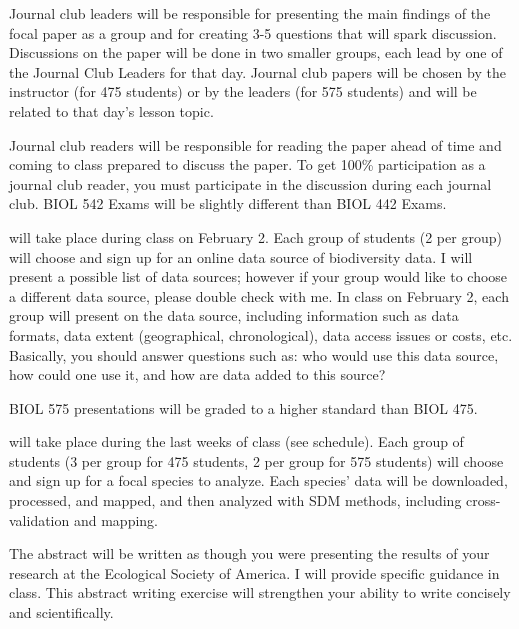 \documentclass{tufte-handout}
\begin{document}
\begin{fullwidth} 

Journal club leaders will be responsible for presenting the main findings of the focal paper as a group and for creating 3-5 questions that will spark discussion. Discussions on the paper will be done in two smaller groups, each lead by one of the Journal Club Leaders for that day. Journal club papers will be chosen by the instructor (for 475 students) or by the leaders (for 575 students) and will be related to that day's lesson topic. 


Journal club readers will be responsible for reading the paper ahead of time and coming to class prepared to discuss the paper. To get 100\% participation as a journal club reader, you must participate in the discussion during each journal club. BIOL 542 Exams will be slightly different than BIOL 442 Exams. 



 will take place during class on February 2. Each group of students (2 per group) will choose and sign up for an online data source of biodiversity data. I will present a possible list of data sources; however if your group would like to choose a different data source, please double check with me. In class on February 2, each group will present on the data source, including information such as data formats, data extent (geographical, chronological), data access issues or costs, etc. Basically, you should answer questions such as: who would use this data source, how could one use it, and how are data added to this source? 

BIOL 575 presentations will be graded to a higher standard than BIOL 475. 


 will take place during the last weeks of class (see schedule). Each group of students (3 per group for 475 students, 2 per group for 575 students) will choose and sign up for a focal species to analyze. Each species' data will be downloaded, processed, and mapped, and then analyzed with SDM methods, including cross-validation and mapping. 

The abstract will be written as though you were presenting the results of your research at the Ecological Society of America. I will provide specific guidance in class. This abstract writing exercise will strengthen your ability to write concisely and scientifically.


\end{fullwidth}
\end{document}
